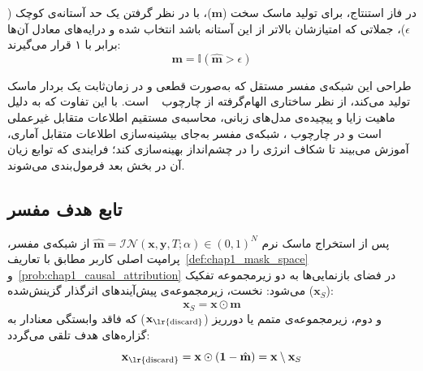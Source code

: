 در فاز استنتاج، برای تولید ماسک سخت ($\mathbf{m}$)، با در نظر گرفتن یک حد آستانه‌ی کوچک ($\epsilon$)، جملاتی که امتیازشان بالاتر از این آستانه باشد انتخاب شده و درایه‌های معادل آن‌ها برابر با ۱ قرار می‌گیرند:
\begin{equation}\label{eq:chap4_interp_hard_mask}
    \mathbf{m} = \mathbb{I}(\hat{\mathbf{m}} > \epsilon)
\end{equation}

طراحی این شبکه‌ی مفسر مستقل که به‌صورت قطعی و در زمان‌ثابت یک بردار ماسک تولید می‌کند، از نظر ساختاری الهام‌گرفته از چارچوب ~\cite{chen2018learning} است. با این تفاوت که به دلیل ماهیت زایا و پیچیده‌ی مدل‌های زبانی، محاسبه‌ی مستقیم اطلاعات متقابل غیرعملی است و در چارچوب ، شبکه‌ی مفسر به‌جای بیشینه‌سازی اطلاعات متقابل آماری، آموزش می‌بیند تا شکاف انرژی را در چشم‌انداز  بهینه‌سازی کند؛ فرایندی که توابع زیان آن در بخش بعد فرمول‌بندی می‌شوند.


\subsection{تابع هدف مفسر}\label{sec:4-4-2}

پس از استخراج ماسک نرم $\hat{\mathbf{m}} = \mathcal{IN}(\mathbf{x}, \mathbf{y}, T; \alpha) \in {(0, 1)}^N$ از شبکه‌ی مفسر، پرامپت اصلی کاربر مطابق با تعاریف~\ref{def:chap1_mask_space} و~\ref{prob:chap1_causal_attribution} در فضای بازنمایی‌ها به دو زیرمجموعه تفکیک می‌شود:
نخست، زیرمجموعه‌ی پیش‌آیندهای اثرگذار گزینش‌شده ($\mathbf{x}_S$):
\begin{equation}
    \mathbf{x}_S = \mathbf{x} \odot \hat{\mathbf{m}}
\end{equation}
و دوم، زیرمجموعه‌ی متمم یا دورریز ($\mathbf{x}_{\text{\lr{discard}}}$) که فاقد وابستگی معنادار به گزاره‌های هدف تلقی می‌گردد:
\begin{equation}
    \mathbf{x}_{\text{\lr{discard}}} = \mathbf{x} \odot (\mathbf{1} - \hat{\mathbf{m}}) = \mathbf{x} \setminus \mathbf{x}_S
\end{equation}

